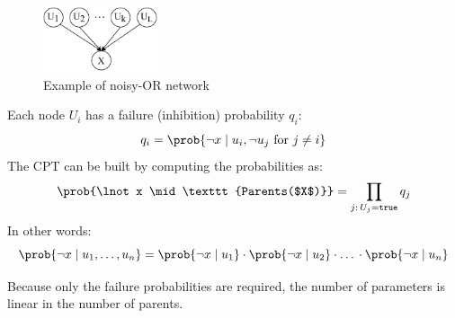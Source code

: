 \begin{figure}[h]
    \centering
    \includegraphics[width=0.3\textwidth]{img/_noisy_or_example.pdf}
    \caption{Example of noisy-OR network}
\end{figure}

Each node $U_i$ has a failure (inhibition) probability $q_i$:
\[ q_i = \prob{\lnot x \mid u_i, \lnot u_j \text{ for } j \neq i} \]
The CPT can be built by computing the probabilities as:
\[ \prob{\lnot x \mid \texttt{Parents($X$)}} = \prod_{j:\, U_j = \texttt{true}} q_j \]
In other words:
\[ \prob{\lnot x \mid u_1, \dots, u_n} = 
    \prob{\lnot x \mid u_1} \cdot \prob{\lnot x \mid u_2} \cdot \text{\dots} \cdot \prob{\lnot x \mid u_n} \]

Because only the failure probabilities are required, the number of parameters is linear in the number of parents.

